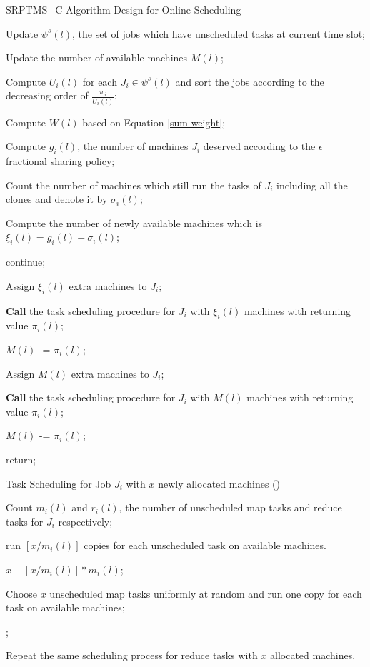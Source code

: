 \documentclass[10pt,conference,compsocconf,letterpaper]{IEEEtran}
\begin{document}
\IncMargin{1em}
\begin{algorithm}
\label{ESE_code}
\caption{SRPTMS+C Algorithm Design for Online Scheduling}
\Indm
\Indp
Update $\psi^s (l)$,  the set of jobs which have unscheduled tasks at current time slot;

Update the number of available machines $M(l)$;

Compute ${U_i(l)}$ for each $J_i \in \psi^s (l)$ and sort the jobs according to the decreasing order of $\frac{w_i}{U_i(l)}$;

Compute $W(l)$ based on Equation \eqref{sum-weight};

{
Compute $g_i(l)$, the number of machines $J_i$ deserved according to the $\epsilon$ fractional sharing policy;
}

{
\label{repeat-process}


Count the number of machines which still run the tasks of $J_i$ including all the clones and denote it by $\sigma_i(l)$;



Compute the number of newly available machines which is $\xi_i(l) = g_i(l) - \sigma_i(l)$;

{
 continue;
}
{
 Assign $\xi_i(l)$ extra machines to $J_i$;

\textbf{Call} the task scheduling procedure for $J_i$ with $\xi_i(l)$ machines with returning value $\pi_i(l)$;

 $M(l)$ -= $\pi_i(l)$;
}
{
 Assign $M(l)$ extra machines to $J_i$;

 \textbf{Call} the task scheduling procedure for $J_i$ with $M(l)$ machines with returning value $\pi_i(l)$;

 $M(l)$ -= $\pi_i(l)$;

}
}





return;
\end{algorithm}
\DecMargin{1em}



\IncMargin{1em}
\begin{procedure}
\caption{Task Scheduling for Job $J_i$ with $x$ newly allocated machines ()}
\Indm
{}
\Indp
Count $m_i(l)$ and $r_i(l)$, the number of unscheduled map tasks and reduce tasks for $J_i$ respectively;

{
 run $[x/m_i(l)]$ copies for each unscheduled task on available machines.

 \Return $x - [x/m_i(l)]*m_i(l)$;
}
{
 Choose $x$ unscheduled map tasks uniformly at random and run one copy for each task on available machines;

 ;
}
\Else
{
Repeat the same scheduling process for reduce tasks with $x$ allocated machines.
}

\label{task-mapping}
\end{procedure}
\DecMargin{1em}
\end{document}

